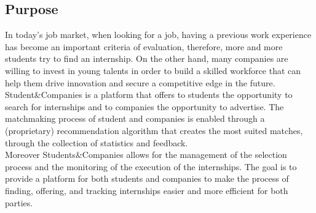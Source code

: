



\subsection{Purpose}
    In today's job market, when looking for a job, having a previous work experience has become an important criteria of evaluation, therefore, more and more students try to find an internship. On the other hand, many companies are willing to invest in young talents in order to build a skilled workforce that can help them drive innovation and secure a competitive edge in the future. \\
    Student\&Companies is a platform that offers to students the opportunity to search for internships and to companies the opportunity to advertise. The matchmaking process of student and companies is enabled through a (proprietary) recommendation algorithm that creates the most suited matches, through the collection of statistics and feedback. \\
    Moreover Students\&Companies allows for the management of the selection process and the monitoring of the execution of the internships. The goal is to provide a platform for both students and companies to make the process of finding, offering, and tracking internships easier and more efficient for both parties.

